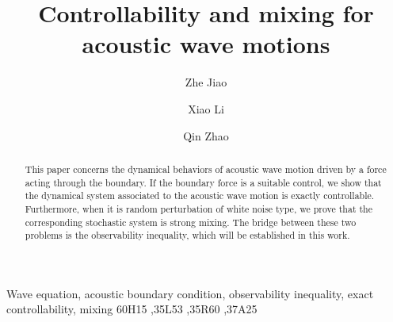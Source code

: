 \documentclass[10pt]{elsarticle}
\begin{document}
\begin{frontmatter}

\title{Controllability and mixing for acoustic wave motions}

\author[mymainaddress]{Zhe Jiao}




\author[mymainaddress]{Xiao Li}

\author[mythirdaddress]{Qin Zhao}


\address[mymainaddress]{School of Mathematics and Statistics, MOE Key Laboratory for Complexity Science in Aerospace, Northwestern Polytechnical University, Xi'an 710129, China}



\address[mythirdaddress]{School of Mathematics and Statistics, Wuhan University of Technology, Wuhan 430070, China}

\begin{abstract}
This paper concerns the dynamical behaviors of acoustic wave motion driven by a force acting through the boundary. 
If the boundary force is a suitable control, we show that the dynamical system associated to the acoustic wave motion is exactly controllable. Furthermore, when it is random perturbation of white noise type, we prove that the corresponding stochastic system is strong mixing. The bridge between these two problems is the observability inequality, which will be established in this work. 
\end{abstract}

\begin{keyword}
Wave equation, acoustic boundary condition, observability inequality, exact controllability, mixing
\MSC[2020] 60H15 \sep 35L53 \sep 35R60 \sep 37A25
\end{keyword}

\end{frontmatter}
\end{document}
